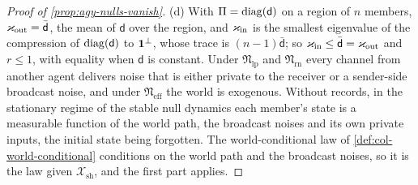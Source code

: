 \begin{proof}[Proof of \cref{prop:agy-nulls-vanish}]
(d) With $\Pi=\operatorname{diag}(\mathsf d)$ on a region of $n$ members, $\varkappa_{\mathrm{out}}=\bar{\mathsf d}$, the mean of $\mathsf d$ over the region, and $\varkappa_{\mathrm{in}}$ is the smallest eigenvalue of the compression of $\operatorname{diag}(\mathsf d)$ to $\mathbf{1}^\perp$, whose trace is $(n-1)\bar{\mathsf d}$; so $\varkappa_{\mathrm{in}}\le\bar{\mathsf d}=\varkappa_{\mathrm{out}}$ and $r\le1$, with equality when $\mathsf d$ is constant. Under $\mathfrak N_{\mathrm{lp}}$ and $\mathfrak N_{\mathrm{rn}}$ every channel from another agent delivers noise that is either private to the receiver or a sender-side broadcast noise, and under $\mathfrak N_{\mathrm{eff}}$ the world is exogenous. Without records, in the stationary regime of the stable null dynamics each member's state is a measurable function of the world path, the broadcast noises and its own private inputs, the initial state being forgotten. The world-conditional law of \cref{def:col-world-conditional} conditions on the world path and the broadcast noises, so it is the law given $\mathcal X_{\mathrm{sh}}$, and the first part applies.
\end{proof}

